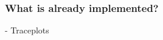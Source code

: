 \documentclass[article]{jss}
\begin{document}


\subsubsection{What is already implemented?}

- Traceplots
\end{document}
